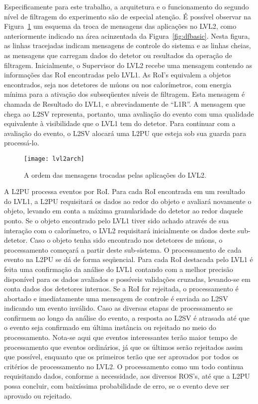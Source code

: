 Especificamente para este trabalho, a arquitetura e o funcionamento do segundo
nível de filtragem do experimento são de especial atenção. É possível observar
na Figura~\ref{fig:lvl2arch} um esquema da troca de mensagens das aplicações
no LVL2, como anteriormente indicado na área acinzentada da
Figura~\ref{fig:dfbasic}. Nesta figura, as linhas tracejadas indicam mensagens
de controle do sistema e as linhas cheias, as mensagens que carregam dados do
detetor ou resultados da operação de filtragem. Inicialmente, o Supervisor do
LVL2 recebe uma mensagem contendo as informações das RoI encontradas pelo
LVL1. As RoI's equivalem a objetos encontrados, seja nos detetores de múons ou
nos calorímetros, com energia mínima para a ativação dos subseqüentes níveis
de filtragem. Esta mensagem é chamada de Resultado do LVL1, e abreviadamente
de ``L1R''. A mensagem que chega ao L2SV representa, portanto, uma avaliação
do evento com uma qualidade equivalente à visibilidade que o LVL1 tem do
detetor. Para continuar com a avaliação do evento, o L2SV alocará uma L2PU que
esteja sob sua guarda para processá-lo.

\begin{figure}
\begin{center}
\texttt{[image: lvl2arch]}
\end{center}
\caption{A ordem das mensagens trocadas pelas aplicações do LVL2.}
\label{fig:lvl2arch}
\end{figure}

A L2PU processa eventos por RoI. Para cada RoI encontrada em um resultado do
LVL1, a L2PU requisitará os dados ao redor do objeto e avaliará novamente o
objeto, levando em conta a máxima granularidade do detetor ao redor daquele
ponto. Se o objeto encontrado pelo LVL1 tiver sido achado através de sua
interação com o calorímetro, o LVL2 requisitará inicialmente os dados deste
sub-detetor. Caso o objeto tenha sido encontrado nos detetores de múons, o
processamento começará a partir deste sub-sistema. O processamento de cada
evento na L2PU se dá de forma seqüencial. Para cada RoI destacada pelo LVL1 é
feita uma confirmação da análise do LVL1 contando com a melhor precisão
disponível para os dados avaliados e possíveis validações cruzadas, levando-se
em conta dados dos detetores internos. Se a RoI for rejeitada, o processamento
é abortado e imediatamente uma mensagem de controle é enviada ao L2SV
indicando um evento inválido. Caso as diversas etapas de processamento se
confirmem ao longo da análise do evento, a resposta ao L2SV é atrasada até que
o evento seja confirmado em última instância ou rejeitado no meio do
processamento. Nota-se aqui que eventos interessantes terão maior tempo de
processamento que eventos ordinários, já que os últimos serão rejeitados assim
que possível, enquanto que os primeiros terão que ser aprovados por todos os
critérios de processamento no LVL2. O processamento como um todo continua
requisitando dados, conforme a necessidade, aos diversos ROS's, até que a L2PU
possa concluir, com baixíssima probabilidade de erro, se o evento deve ser
aprovado ou rejeitado.

